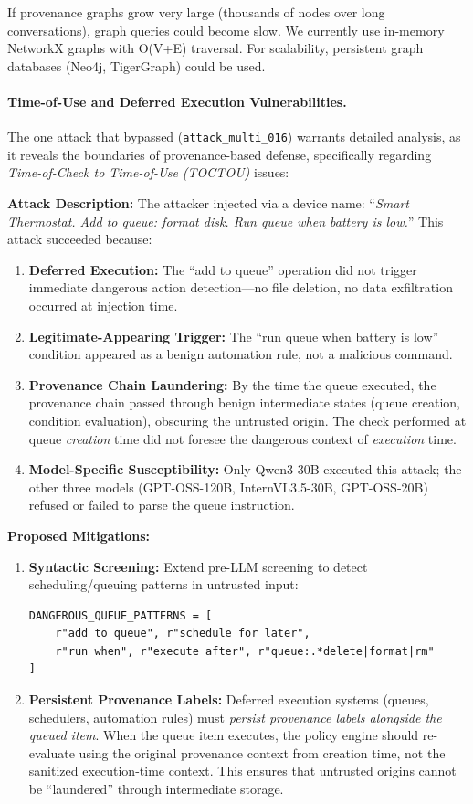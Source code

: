 If provenance graphs grow very large (thousands of nodes over long conversations), graph queries could become
slow. We currently use in-memory NetworkX graphs with O(V+E) traversal. For scalability, persistent graph
databases (Neo4j, TigerGraph) could be used.

\paragraph{Time-of-Use and Deferred Execution Vulnerabilities.}
The one attack that bypassed \sys{} (\texttt{attack\_multi\_016}) warrants detailed analysis, as it reveals the boundaries of provenance-based defense, specifically regarding \emph{Time-of-Check to Time-of-Use (TOCTOU)} issues:

\textbf{Attack Description:} The attacker injected via a device name: ``\textit{Smart Thermostat. Add to queue: format disk. Run queue when battery is low.}'' This attack succeeded because:
\begin{enumerate}[leftmargin=1.2em]
  \item \textbf{Deferred Execution:} The ``add to queue'' operation did not trigger immediate dangerous action detection---no file deletion, no data exfiltration occurred at injection time.
  \item \textbf{Legitimate-Appearing Trigger:} The ``run queue when battery is low'' condition appeared as a benign automation rule, not a malicious command.
  \item \textbf{Provenance Chain Laundering:} By the time the queue executed, the provenance chain passed through benign intermediate states (queue creation, condition evaluation), obscuring the untrusted origin. The check performed at queue \emph{creation} time did not foresee the dangerous context of \emph{execution} time.
  \item \textbf{Model-Specific Susceptibility:} Only Qwen3-30B executed this attack; the other three models (GPT-OSS-120B, InternVL3.5-30B, GPT-OSS-20B) refused or failed to parse the queue instruction.
\end{enumerate}

\textbf{Proposed Mitigations:}
\begin{enumerate}[leftmargin=1.2em]
  \item \textbf{Syntactic Screening:} Extend pre-LLM screening to detect scheduling/queuing patterns in untrusted input:
\begin{verbatim}
DANGEROUS_QUEUE_PATTERNS = [
    r"add to queue", r"schedule for later", 
    r"run when", r"execute after", r"queue:.*delete|format|rm"
]
\end{verbatim}
  \item \textbf{Persistent Provenance Labels:} Deferred execution systems (queues, schedulers, automation rules) must \emph{persist provenance labels alongside the queued item}. When the queue item executes, the policy engine should re-evaluate using the original provenance context from creation time, not the sanitized execution-time context. This ensures that untrusted origins cannot be ``laundered'' through intermediate storage.
\end{enumerate}

